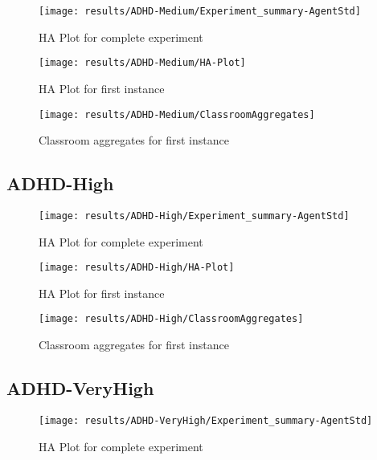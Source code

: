 \begin{figure}[H]
    \centering
    \texttt{[image: results/ADHD-Medium/Experiment\_summary-AgentStd]}
    \caption{HA Plot for complete experiment}
\end{figure}

\begin{figure}[H]
    \centering
    \texttt{[image: results/ADHD-Medium/HA-Plot]}
    \caption{HA Plot for first instance}
\end{figure}

\begin{figure}[H]
    \centering
    \texttt{[image: results/ADHD-Medium/ClassroomAggregates]}
    \caption{Classroom aggregates for first instance}
\end{figure}


\subsection{ADHD-High}

\begin{figure}[H]
    \centering
    \texttt{[image: results/ADHD-High/Experiment\_summary-AgentStd]}
    \caption{HA Plot for complete experiment}
\end{figure}

\begin{figure}[H]
    \centering
    \texttt{[image: results/ADHD-High/HA-Plot]}
    \caption{HA Plot for first instance}
\end{figure}

\begin{figure}[H]
    \centering
    \texttt{[image: results/ADHD-High/ClassroomAggregates]}
    \caption{Classroom aggregates for first instance}
\end{figure}


\subsection{ADHD-VeryHigh}

\begin{figure}[H]
    \centering
    \texttt{[image: results/ADHD-VeryHigh/Experiment\_summary-AgentStd]}
    \caption{HA Plot for complete experiment}
\end{figure}

